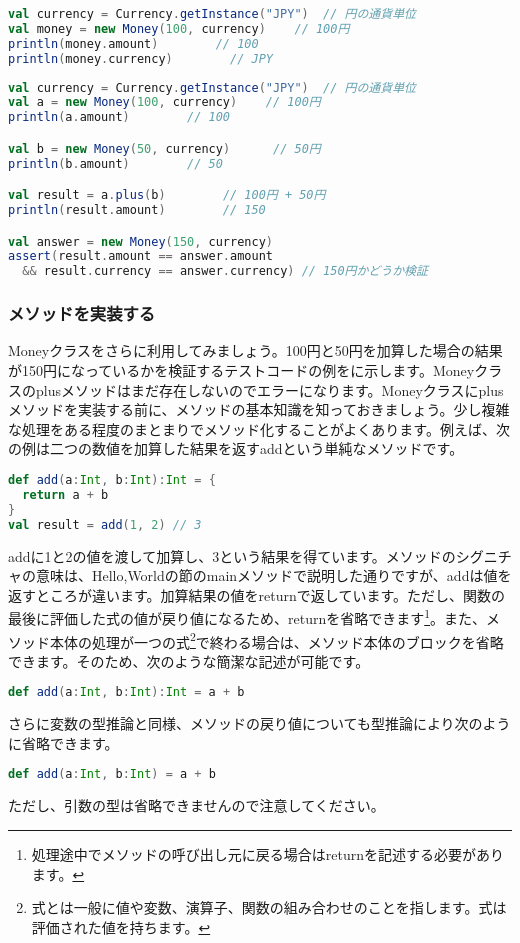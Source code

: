 \begin{lstlisting}[language=scala, label=src:money_100yen, caption=100円を表すコード]
val currency = Currency.getInstance("JPY")  // 円の通貨単位
val money = new Money(100, currency)    // 100円
println(money.amount)        // 100
println(money.currency)        // JPY
\end{lstlisting}

\begin{lstlisting}[language=scala, label=src:money_test, caption=100円と50円を加算した結果が150円になっているかを検証するテストコード。Moneyクラスのplusメソッドはまだ存在しないので実行するとエラーになる]
val currency = Currency.getInstance("JPY")  // 円の通貨単位
val a = new Money(100, currency)    // 100円
println(a.amount)        // 100

val b = new Money(50, currency)      // 50円
println(b.amount)        // 50

val result = a.plus(b)        // 100円 + 50円
println(result.amount)        // 150

val answer = new Money(150, currency)
assert(result.amount == answer.amount
  && result.currency == answer.currency) // 150円かどうか検証
\end{lstlisting}

\subsubsection{メソッドを実装する}
Moneyクラスをさらに利用してみましょう。100円と50円を加算した場合の結果が150円になっているかを検証するテストコードの例をに示します。Moneyクラスのplusメソッドはまだ存在しないのでエラーになります。Moneyクラスにplusメソッドを実装する前に、メソッドの基本知識を知っておきましょう。少し複雑な処理をある程度のまとまりでメソッド化することがよくあります。例えば、次の例は二つの数値を加算した結果を返すaddという単純なメソッドです。
\begin{lstlisting}[language=scala, frame=none]
def add(a:Int, b:Int):Int = {
  return a + b
}
val result = add(1, 2) // 3
\end{lstlisting}
addに1と2の値を渡して加算し、3という結果を得ています。メソッドのシグニチャの意味は、Hello,Worldの節のmainメソッドで説明した通りですが、addは値を返すところが違います。加算結果の値をreturnで返しています。ただし、関数の最後に評価した式の値が戻り値になるため、returnを省略できます\footnote{処理途中でメソッドの呼び出し元に戻る場合はreturnを記述する必要があります。}。また、メソッド本体の処理が一つの式\footnote{式とは一般に値や変数、演算子、関数の組み合わせのことを指します。式は評価された値を持ちます。}で終わる場合は、メソッド本体のブロックを省略できます。そのため、次のような簡潔な記述が可能です。
\begin{lstlisting}[language=scala, frame=none]
def add(a:Int, b:Int):Int = a + b
\end{lstlisting}
さらに変数の型推論と同様、メソッドの戻り値についても型推論により次のように省略できます。
\begin{lstlisting}[language=scala, frame=none]
def add(a:Int, b:Int) = a + b
\end{lstlisting}
ただし、引数の型は省略できませんので注意してください。

